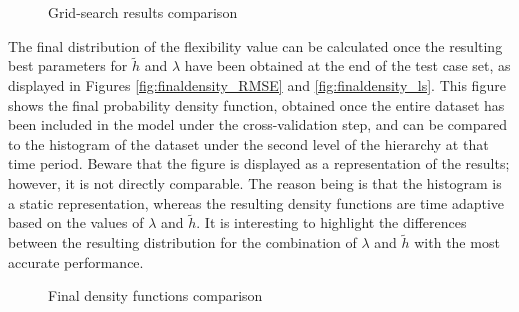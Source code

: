 \begin{figure}[htbp]
\centering     %
{}
\caption{Grid-search results comparison}
\label{fig:onlinekde_rmse}
\end{figure}


The final distribution of the flexibility value can be calculated once the resulting best parameters for $\widetilde{h}$ and $\lambda$ have been obtained at the end of the test case set, as displayed in Figures \ref{fig:finaldensity_RMSE} and \ref{fig:finaldensity_ls}. This figure shows the final probability density function, obtained once the entire dataset has been included in the model under the cross-validation step, and can be compared to the histogram of the dataset under the second level of the hierarchy at that time period. Beware that the figure is displayed as a representation of the results; however, it is not directly comparable. The reason being is that the histogram is a static representation, whereas the resulting density functions are time adaptive based on the values of $\lambda$ and $\widetilde{h}$. It is interesting to highlight the differences between the resulting distribution for the combination of $\lambda$ and $\widetilde{h}$ with the most accurate performance.

\begin{figure}[ht!]
\centering     %
{}
\caption{Final density functions comparison}
\label{fig:distribution_RMSE_LS}
\end{figure}

